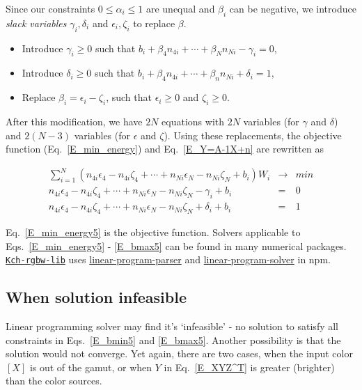 \documentclass[dvipdfmx,a4paper]{article}
\begin{document}
Since our constraints $0 \leq \alpha_i \leq 1$ are unequal and $\beta_i$ can be negative, we introduce \textit{slack variables} $\gamma_i, \delta_i$ and $\epsilon_i, \zeta_i$ to replace $\beta$.

\begin{itemize}
  \item Introduce $\gamma_i \geq 0$ such that $b_i + \beta_4 n_{4i} + \cdots + \beta_N n_{Ni} - \gamma_i = 0$,

  \item Introduce $\delta_i \geq 0$ such that $b_i + \beta_4 n_{4i} + \cdots + \beta_n n_{Ni} + \delta_i = 1$,

  \item Replace $\beta_i = \epsilon_i - \zeta_i$, such that $\epsilon_i \geq 0 $ and $\zeta_i \geq 0$.
\end{itemize}

After this modification, we have $2N$ equations with $2N$ variables (for $\gamma$ and $\delta$) and $2(N-3)$ variables (for $\epsilon$ and $\zeta$). Using these replacements, the objective function (Eq.~\eqref{E_min_energy}) and Eq.~\eqref{E_Y=A-1X+n} are rewritten as

\begin{eqnarray}
%
  \label{E_min_energy5}
  \sum_{i=1}^N (n_{4i} \epsilon_4 - n_{4i} \zeta_4 + \cdots +  n_{Ni} \epsilon_N - n_{Ni} \zeta_N + b_{i}) W_i &\to& min \\
%
  \label{E_bmin5}
  n_{4i} \epsilon_4  - n_{4i} \zeta_4 + \cdots + n_{Ni} \epsilon_N  - n_{Ni} \zeta_N  - \gamma_i + b_i &=& 0 \\
%
  \label{E_bmax5}
  n_{4i} \epsilon_4  - n_{4i} \zeta_4 + \cdots + n_{Ni} \epsilon_N  - n_{Ni} \zeta_N  + \delta_i + b_i &=& 1
\end{eqnarray}

\noindent
Eq.~\eqref{E_min_energy5} is the objective function. Solvers applicable to Eqs.~\eqref{E_min_energy5} - \eqref{E_bmax5} can be found in many numerical packages. \href{https://www.npmjs.com/package/kch-rgbw-lib}{\texttt{Kch-rgbw-lib}} uses \href{https://www.npmjs.com/package/linear-program-parser}{linear-program-parser} and \href{https://www.npmjs.com/package/linear-program-solver}{linear-program-solver} in npm.

\subsection{When solution infeasible}
Linear programming solver may find it's `infeasible' - no solution to satisfy all constraints in Eqs.~\eqref{E_bmin5} and \eqref{E_bmax5}. Another possibility is that the solution would not converge. Yet again, there are two cases, when the input color $[X]$ is out of the gamut, or when $Y$ in Eq.~\eqref{E_XYZ^T} is greater (brighter) than the color sources.
\end{document}
